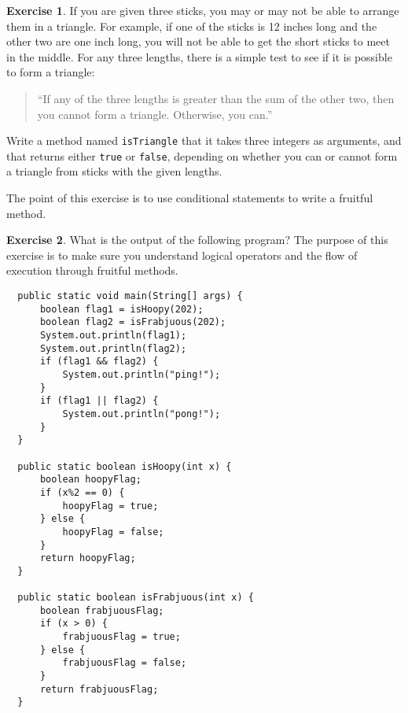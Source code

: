 \documentclass[12pt]{book}
\theoremstyle{definition}
\newtheorem{excz}{Exercise}[chapter]
\newenvironment{exercise}{\bigskip\begin{excz}\mbox{}}{\end{excz}}
\begin{document}
\begin{exercise}
If you are given three sticks, you may or may not be able to arrange
them in a triangle.  For example, if one of the sticks is 12 inches
long and the other two are one inch long, you will
not be able to get the short sticks to meet in the middle.  For any
three lengths, there is a simple test to see if it is possible to form
a triangle:

\begin{quote}
``If any of the three lengths is greater than the sum of the other two,
then you cannot form a triangle.  Otherwise, you can.''
\end{quote}

Write a method named {\tt isTriangle} that it takes three integers as
arguments, and that returns either {\tt true} or {\tt false},
depending on whether you can or cannot form a triangle from sticks
with the given lengths.

The point of this exercise is to use conditional statements to
write a fruitful method.

\end{exercise}


\begin{exercise}
What is the output of the following program?  The purpose of
this exercise is to make sure you understand logical operators
and the flow of execution through fruitful methods.

\begin{lstlisting}
  public static void main(String[] args) {
      boolean flag1 = isHoopy(202);
      boolean flag2 = isFrabjuous(202);
      System.out.println(flag1);
      System.out.println(flag2);
      if (flag1 && flag2) {
          System.out.println("ping!");
      }
      if (flag1 || flag2) {
          System.out.println("pong!");
      }
  }

  public static boolean isHoopy(int x) {
      boolean hoopyFlag;
      if (x%2 == 0) {
          hoopyFlag = true;
      } else {
          hoopyFlag = false;
      }
      return hoopyFlag;
  }

  public static boolean isFrabjuous(int x) {
      boolean frabjuousFlag;
      if (x > 0) {
          frabjuousFlag = true;
      } else {
          frabjuousFlag = false;
      }
      return frabjuousFlag;
  }
\end{lstlisting}
\end{exercise}
\end{document}
